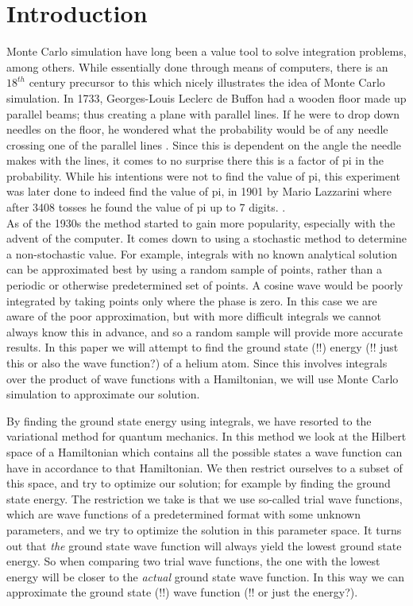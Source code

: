 \section{Introduction}

Monte Carlo simulation have long been a value tool to solve integration problems, among others. While essentially done through means of computers, there is an $18^{th}$ century precursor to this which nicely illustrates the idea of Monte Carlo simulation. In 1733, Georges-Louis Leclerc de Buffon had a wooden floor made up parallel beams; thus creating a plane with parallel lines. If he were to drop down needles on the floor, he wondered what the probability would be of any needle crossing one of the parallel lines \cite{Buffon}. Since this is dependent on the angle the needle makes with the lines, it comes to no surprise there this is a factor of pi in the probability. While his intentions were not to find the value of pi, this experiment was later done to indeed find the value of pi, in 1901 by Mario Lazzarini where after 3408 tosses he found the value of pi up to 7 digits. \cite{Lazzarini}. \\

As of the 1930s the method started to gain more popularity, especially with the advent of the computer. It comes down to using a stochastic method to determine a non-stochastic value. For example, integrals with no known analytical solution can be approximated best by using a random sample of points, rather than a periodic or otherwise predetermined set of points. A cosine wave would be poorly integrated by taking points only where the phase is zero. In this case we are aware of the poor approximation, but with more difficult integrals we cannot always know this in advance, and so a random sample will provide more accurate results. In this paper we will attempt to find the ground state (!!) energy (!! just this or also the wave function?) of a helium atom. Since this involves integrals over the product of wave functions with a Hamiltonian, we will use Monte Carlo simulation to approximate our solution. 

By finding the ground state energy using integrals, we have resorted to the variational method for quantum mechanics. In this method we look at the Hilbert space of a Hamiltonian which contains all the possible states a wave function can have in accordance to that Hamiltonian. We then restrict ourselves to a subset of this space, and try to optimize our solution; for example by finding the ground state energy. The restriction we take is that we use so-called trial wave functions, which are wave functions of a predetermined format with some unknown parameters, and we try to optimize the solution in this parameter space. It turns out that \textit{the} ground state wave function will always yield the lowest ground state energy. So when comparing two trial wave functions, the one with the lowest energy will be closer to the \textit{actual} ground state wave function. In this way we can approximate the ground state (!!) wave function (!! or just the energy?). \cite{AdvStatMech}

